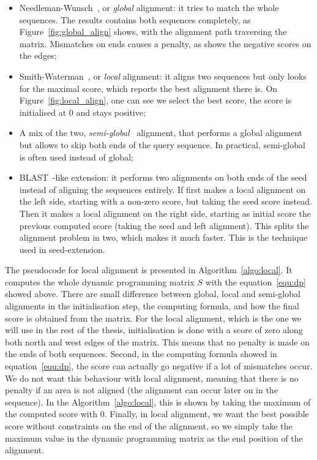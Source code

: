 \begin{itemize}
	\item Needleman-Wunsch~\cite{NeedlemanWunsch:method}, or \emph{global} alignment: it tries to match the whole sequences. The results contains both sequences completely, as Figure~\ref{fig:global_align} shows, with the alignment path traversing the matrix. Mismatches on ends causes a penalty, as shows the negative scores on the edges;
	\item Smith-Waterman~\cite{SmithWaterman:identification}, or \emph{local} alignment: it aligns two sequences but only looks for the maximal score, which reports the best alignment there is. On Figure~\ref{fig:local_align}, one can see we select the best score, the score is initialised at 0 and stays positive;
	\item A mix of the two, \emph{semi-global}~\cite{Durand:course-genomics} alignment, that performs a global alignment but allows to skip both ends of the query sequence. In practical, semi-global is often used instead of global;
	\item BLAST~\cite{Altschul:BLAST}-like extension: it performs two alignments on both ends of the seed instead of aligning the sequences entirely. If first makes a local alignment on the left side, starting with a non-zero score, but taking the seed score instead. Then it makes a local alignment on the right side, starting as initial score the previous computed score (taking the seed and left alignment). This splits the alignment problem in two, which makes it much faster. This is the technique used in seed-extension.
\end{itemize}

The pseudocode for local alignment is presented in Algorithm~\ref{algo:local}. It computes the whole dynamic programming matrix $S$ with the equation~\ref{equ:dp} showed above. There are small difference between global, local and semi-global alignments in the initialisation step, the computing formula, and how the final score is obtained from the matrix. For the local alignment, which is the one we will use in the rest of the thesis, initialisation is done with a score of zero along both north and west edges of the matrix. This means that no penalty is made on the ends of both sequences. Second, in the computing formula showed in equation~\ref{equ:dp}, the score can actually go negative if a lot of mismatches occur. We do not want this behaviour with local alignment, meaning that there is no penalty if an area is not aligned (the alignment can occur later on in the sequence). In the Algorithm~\ref{algo:local}, this is shown by taking the maximum of the computed score with 0. Finally, in local alignment, we want the best possible score without constraints on the end of the alignment, so we simply take the maximum value in the dynamic programming matrix as the end position of the alignment.

